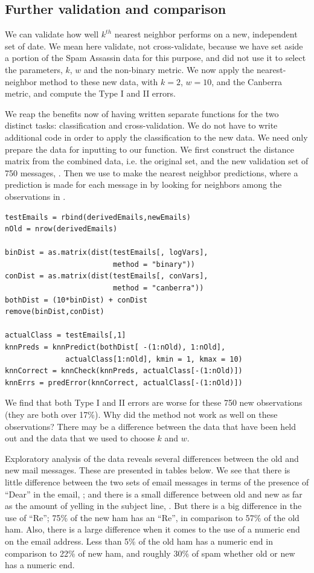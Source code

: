\subsection{Further validation and comparison}
We can validate how well $k^{th}$ nearest neighbor
performs on a new, independent set of date.
We mean here validate, not cross-validate, because
we have set aside a portion of the Spam Assassin data for 
this purpose, and did not use it to select
the parameters, $k$, $w$ and the non-binary metric.
We now apply the nearest-neighbor method to these
new data, with $k =2$, $w = 10$, and the Canberra metric,
and compute the Type I and II errors.

We reap the benefits now of having written separate functions
for the two distinct tasks: classification and  cross-validation.
We do not have to write additional code in order to apply
the classification to the new data.
We need only prepare the data for inputting to our function.
We first construct the distance matrix from the combined data,
i.e. the original set,  and the
new validation set of 750 messages, .
Then we use  to make the
nearest neighbor predictions, where a prediction is made
for each message in  by looking
for neighbors among the observations in .

\begin{verbatim}
testEmails = rbind(derivedEmails,newEmails)
nOld = nrow(derivedEmails)

binDist = as.matrix(dist(testEmails[, logVars], 
                         method = "binary"))
conDist = as.matrix(dist(testEmails[, conVars], 
                         method = "canberra"))
bothDist = (10*binDist) + conDist
remove(binDist,conDist)

actualClass = testEmails[,1]
knnPreds = knnPredict(bothDist[ -(1:nOld), 1:nOld],
              actualClass[1:nOld], kmin = 1, kmax = 10)
knnCorrect = knnCheck(knnPreds, actualClass[-(1:nOld)])
knnErrs = predError(knnCorrect, actualClass[-(1:nOld)])
\end{verbatim}

We find that both Type I and II errors are worse for these
750 new observations (they are both over 17\%).
Why did the method not work as well on these observations?
There may be a difference between the data that have been
held out and the data that we used to choose $k$ and $w$.

Exploratory analysis of the data reveals several
differences between the old and new mail messages.
These are presented in tables below.
We see that there is little difference between
the two sets of email messages in terms of the presence
of ``Dear'' in the email, ; and
there is a small difference between old and new
as far as the amount of yelling in the subject line,
. 
But there is a big difference in the use of ``Re'';
75\% of the new ham has an ``Re'', in comparison to 57\% 
of the old ham.
Also, there is a large difference when it comes to the
use of a numeric end on the email address. 
Less than 5\% of the old ham has a numeric end in comparison 
to 22\% of new ham, and roughly 30\% of spam whether old or new 
has a numeric end.

